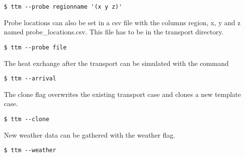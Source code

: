 \documentclass[%
FTMstudentthesis%
,optArial%
,optBiber%
,optEnglish%
,optCMYK%
]{FTMlatex}%
\begin{document}
% 
\begin{code}
\begin{lstlisting}[style =BASH]
$ ttm --probe regionname '(x y z)'
\end{lstlisting}
\end{code}%
%
Probe locations can also be set in a csv file with the columns region, x, y and z named probe\_locations.csv. This file has to be in the transport directory.
% 
\begin{code}
\begin{lstlisting}[style =BASH]
$ ttm --probe file
\end{lstlisting}
\end{code}%
%
The heat exchange after the transport can be simulated with the command
% 
\begin{code}
\begin{lstlisting}[style =BASH]
$ ttm --arrival
\end{lstlisting}
\end{code}%
%
The clone flag overwrites the existing transport case and clones a new template case.
% 
\begin{code}
\begin{lstlisting}[style =BASH]
$ ttm --clone
\end{lstlisting}
\end{code}%
%
New weather data can be gathered with the weather flag.
% 
\begin{code}
\begin{lstlisting}[style =BASH]
$ ttm --weather
\end{lstlisting}
\end{code}%
%
\end{document}
